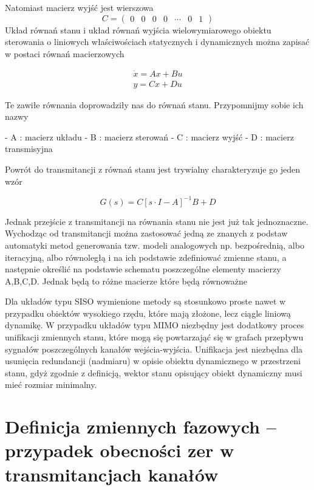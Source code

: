 \documentclass{article}
\begin{document}
		Natomiast macierz wyjść jest wierszowa
		\begin{equation}
			C=\begin{pmatrix}
			  0    &   0    &   0    &   0    & \cdots &   0      &   1
			\end{pmatrix}
		\end{equation}
		Układ równań stanu i układ równań wyjścia wielowymiarowego obiektu sterowania o
		liniowych właściwościach statycznych i dynamicznych można zapisać w postaci
		równań macierzowych

			\begin{align*}
				 \dot{x} = Ax + Bu \\
				 y       = Cx + Du 
			\end{align*}

		Te zawiłe równania doprowadziły nas do równań stanu. Przypomnijmy sobie ich nazwy

		- A : macierz układu
		- B : macierz sterowań
		- C : macierz wyjść
		- D : macierz transmisyjna

		Powrót do transmitancji z równań stanu jest trywialny
		charakteryzuje go jeden wzór

		\begin{equation}
			G(s) = C[s \cdot I - A]^{-1}B + D
		\end{equation}

		Jednak przejście z transmitancji na równania stanu nie jest już tak jednoznaczne.
		Wychodząc od transmitancji można zastosować jedną ze znanych z podstaw
		automatyki metod generowania tzw. modeli analogowych
		np. bezpośrednią, albo iteracyjną, albo równoległą i na ich podstawie
		zdefiniować zmienne stanu, a następnie określić na podstawie schematu poszczególne
		elementy macierzy A,B,C,D.
		Jednak będą to różne macierze które będą równoważne

		Dla układów typu SISO wymienione metody są stosunkowo proste nawet w przypadku
		obiektów wysokiego rzędu, które mają złożone, lecz ciągle liniową dynamikę.
		W przypadku układów typu MIMO niezbędny jest dodatkowy proces unifikacji
		zmiennych stanu, które mogą się powtarzająć się w grafach przepływu sygnałów
		poszczególnych kanałów wejścia-wyjścia. Unifikacja jest niezbędna dla usunięcia
		redundancji (nadmiaru) w opisie obiektu dynamicznego w przestrzeni stanu, gdyż
		zgodnie z definicją, wektor stanu opisujący obiekt dynamiczny musi
		mieć rozmiar minimalny.

	\section{Definicja zmiennych fazowych – przypadek obecności zer w transmitancjach kanałów}
\end{document}
